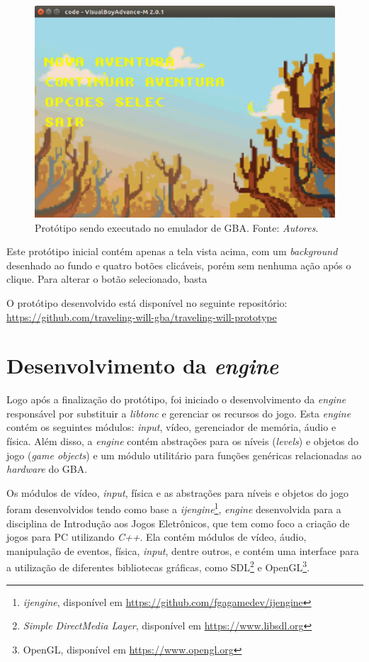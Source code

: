 \begin{figure}[H]
 \centering \includegraphics[keepaspectratio=true,scale=0.6]{figuras/tw-gba-1.eps}
   \caption[Protótipo sendo executado no emulador de GBA]
    {Protótipo sendo executado no emulador de GBA. Fonte: \textit{Autores}.}
   \label{tw-gba-1}
\end{figure}

Este protótipo inicial contém apenas a tela vista acima, com um \textit{background} desenhado ao fundo e quatro botões clicáveis, porém sem nenhuma ação após o clique. Para alterar o botão selecionado, basta

O protótipo desenvolvido está disponível no seguinte repositório: \url{https://github.com/traveling-will-gba/traveling-will-prototype}

\section{Desenvolvimento da \textit{engine}}

Logo após a finalização do protótipo, foi iniciado o desenvolvimento da \textit{engine} responsável por substituir a \textit{libtonc} e gerenciar os recursos do jogo. Esta \textit{engine} contém os seguintes módulos: \textit{input}, vídeo, gerenciador de memória, áudio e física. Além disso, a \textit{engine} contém abstrações para os níveis (\textit{levels}) e objetos do jogo (\textit{game objects}) e um módulo utilitário para funções genéricas relacionadas ao \textit{hardware} do GBA.

Os módulos de vídeo, \textit{input}, física e as abstrações para níveis e objetos do jogo foram desenvolvidos tendo como base a \textit{ijengine}\footnote{\textit{ijengine}, disponível em \url{https://github.com/fgagamedev/ijengine}}, \textit{engine} desenvolvida para a disciplina de Introdução aos Jogos Eletrônicos, que tem como foco a criação de jogos para PC utilizando \textit{C++}. Ela contém módulos de vídeo, áudio, manipulação de eventos, física, \textit{input}, dentre outros, e contém uma interface para a utilização de diferentes bibliotecas gráficas, como SDL\footnote{\textit{Simple DirectMedia Layer}, disponível em \url{https://www.libsdl.org}} e OpenGL\footnote{OpenGL, disponível em \url{https://www.opengl.org}}.

